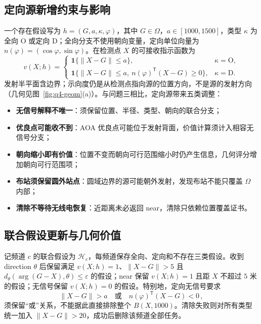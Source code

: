 \documentclass[withoutpreface]{cumcmthesis}
\begin{document}
\subsection{定向源新增约束与影响}

一个存在假设写为 $h=(G,a,\kappa,\varphi)$，其中 $G\in\Omega$，$a\in[1000,1500]$，类型 $\kappa$ 为全向 $\mathrm O$ 或定向 $\mathrm D$；全向分支不使用朝向变量，定向单位向量为 $n(\varphi)=(\cos\varphi,\sin\varphi)$。在检测点 $X$ 的可接收指示函数为
\begin{equation}\label{eq:v_indicator}
v(X;h)=
\begin{cases}
\mathbf 1\{\|X-G\|\le a\}, & \kappa=\mathrm O,\\[2pt]
\mathbf 1\{\|X-G\|\le a,\ n(\varphi)^{\mathsf T}(X-G)\ge0\}, & \kappa=\mathrm D.
\end{cases}
\end{equation}
发射半平面含边界；示向度仍是从检测点指向源的位置方向，不是源的发射方向（几何见图~\cref{fig:q4-geom}(a)）。与问题三相比，定向源带来五类调整：

\begin{itemize}
\item \textbf{无信号解释不唯一}：须保留位置、半径、类型、朝向的联合分支；
\item \textbf{优良点可能收不到}：AOA 优良点可能位于发射背面，价值计算须计入相容无信号分支；
\item \textbf{朝向缩小即有价值}：位置不变而朝向可行范围缩小时仍产生信息，几何评分增加朝向可行范围项；
\item \textbf{布站须保留圆外站点}：圆域边界的源可能朝外发射，发现布站不能只覆盖 $\Omega$ 内部；
\item \textbf{清除不等待无线电恢复}：近距离未必返回 near，清除只依赖位置覆盖证书。
\end{itemize}

\subsection{联合假设更新与几何价值}

记频道 $c$ 的联合假设为 $\mathcal H_c$，每频道保存全向、定向和不存在三类假设。收到 direction $\theta$ 后保留满足 $v(X;h)=1$、$\|X-G\|>5$ 且 $d_\theta(\operatorname{arg}(G-X),\theta)\le\varepsilon$ 的假设；near 保留 $v(X;h)=1$ 且距 $X$ 不超过 $5$ 米的假设；无信号保留 $v(X;h)=0$ 的假设。特别地，定向无信号要求
\begin{equation}\label{eq:d_nosignal}
\boxed{
\|X-G\|>a
\quad\text{或}\quad
n(\varphi)^{\mathsf T}(X-G)<0
}\,,
\end{equation}
须保留“或”关系，不能据此直接排除整个 $B(X,1000)$。清除失败则对所有类型统一加入 $\|X-G\|>20$，成功后删除该频道全部任务。
\end{document}
